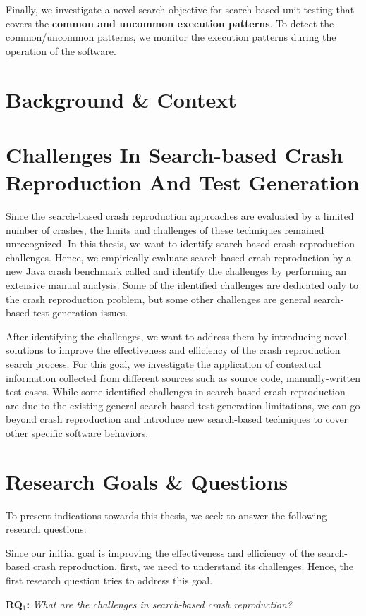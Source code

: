 Finally, we investigate a novel search objective for search-based unit testing that covers the \textbf{common and uncommon execution patterns}. To detect the common/uncommon patterns, we monitor the execution patterns during the operation of the software.

\section{Background \& Context}


\section{Challenges In Search-based Crash Reproduction And Test Generation}
Since the search-based crash reproduction approaches are evaluated by a limited number of crashes, the limits and challenges of these techniques remained unrecognized.
In this thesis, we want to identify search-based crash reproduction challenges. Hence, we empirically evaluate search-based crash reproduction by a new Java crash benchmark called \jcrashpack and identify the challenges by performing an extensive manual analysis. Some of the identified challenges are dedicated only to the crash reproduction problem, but some other challenges are general search-based test generation issues.

After identifying the challenges, we want to address them by introducing novel solutions to improve the effectiveness and efficiency of the crash reproduction search process. For this goal, we investigate the application of contextual information collected from different sources such as source code, manually-written test cases. While some identified challenges in search-based crash reproduction are due to the existing general search-based test generation limitations, we can go beyond crash reproduction and introduce new search-based techniques to cover other specific software behaviors.

\section{Research Goals \& Questions}
To present indications towards this thesis, we seek to answer the following research questions:

Since our initial goal is improving the effectiveness and efficiency of the search-based crash reproduction, first, we need to understand its challenges. Hence, the first research question tries to address this goal.
\begin{framed}
\quad\textbf{RQ$_1$: } \textit{What are the challenges in search-based crash reproduction?}
\end{framed}

